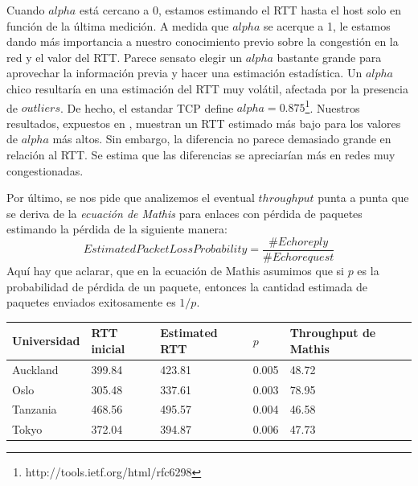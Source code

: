 \documentclass[final,inline,a4paper,narroweqnarray]{ieee}
\begin{document}
Cuando $alpha$ está cercano a 0, estamos estimando el RTT hasta el host solo en función de la última medición. A medida que $alpha$ se acerque a 1, le estamos dando más importancia a nuestro conocimiento previo sobre la congestión en la red y el valor del RTT. Parece sensato elegir un $alpha$ bastante grande para aprovechar la información previa y hacer una estimación estadística. Un $alpha$ chico resultaría en una estimación del RTT muy volátil, afectada por la presencia de $outliers$.
De hecho, el estandar TCP define $alpha=0.875$\footnote{http://tools.ietf.org/html/rfc6298}.
Nuestros resultados, expuestos en , muestran un RTT estimado más bajo para los valores de $alpha$ más altos. Sin embargo, la diferencia no parece demasiado grande en relación al RTT. Se estima que las diferencias se apreciarían más en redes muy congestionadas.

Por último, se nos pide que analizemos el eventual $throughput$ punta a punta
que se deriva de la \emph{ecuación de Mathis} para enlaces con pérdida de
paquetes estimando la pérdida de la siguiente manera:
\[
EstimatedPacketLossProbability = \dfrac{\#Echo reply}{\#Echo request}
\]
Aquí hay que aclarar, que en la ecuación de Mathis asumimos que si $p$ es la
probabilidad de pérdida de un paquete, entonces la cantidad estimada de paquetes
enviados exitosamente es $1/p$.

\begin{tabular}{| p{1.6cm} | p{1.2cm} | p{1.4cm} | p{1.2cm} | p{1.7cm} |}
  \hline
  Universidad & RTT inicial & Estimated RTT & $p$ & Throughput de Mathis \\
  \hline
  Auckland & 399.84 & 423.81 & 0.005 & 48.72 \\
  Oslo & 305.48 & 337.61 & 0.003 & 78.95 \\
  Tanzania & 468.56 & 495.57 & 0.004 & 46.58 \\
  Tokyo & 372.04 & 394.87 & 0.006 & 47.73 \\
  \hline
\end{tabular}
\end{document}
